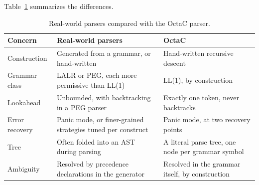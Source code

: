 Table~\ref{tab:parser-simplifications} summarizes the differences.

\begin{table}[H]
\centering
\small
\renewcommand{\arraystretch}{1.15}
\begin{tabular}{@{}>{\raggedright\arraybackslash}p{70pt}>{\raggedright\arraybackslash}p{190pt}>{\raggedright\arraybackslash}p{172pt}@{}}
\toprule
\textbf{Concern} & \textbf{Real-world parsers} & \textbf{OctaC} \\
\midrule
Construction & Generated from a grammar, or hand-written \cite{bison-manual,clang-internals} & Hand-written recursive descent \\
Grammar class & LALR or PEG, each more permissive than LL(1) \cite{aho2006compilers,python-pep617} & LL(1), by construction \\
Lookahead & Unbounded, with backtracking in a PEG parser \cite{python-pep617} & Exactly one token, never backtracks \\
Error recovery & Panic mode, or finer-grained strategies tuned per construct \cite{aho2006compilers} & Panic mode, at two recovery points \\
Tree & Often folded into an AST during parsing & A literal parse tree, one node per grammar symbol \\
Ambiguity & Resolved by precedence declarations in the generator & Resolved in the grammar itself, by construction \\
\bottomrule
\end{tabular}
\caption{Real-world parsers compared with the OctaC parser.}
\label{tab:parser-simplifications}
\end{table}
